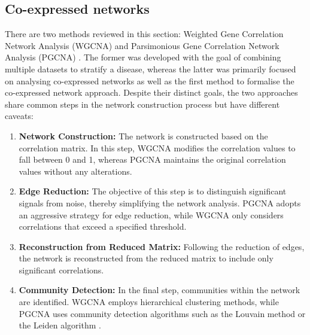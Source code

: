 \subsection{Co-expressed networks} \label{s:lit:co_net}

\vspace{3mm}
\vspace{3mm}

There are two methods reviewed in this section: Weighted Gene Correlation Network Analysis (WGCNA) \citet{Langfelder2008-sn} and Parsimonious Gene Correlation Network Analysis (PGCNA) \citet{Care2019-ij}. The former was developed with the goal of combining multiple datasets to stratify a disease, whereas the latter was primarily focused on analysing co-expressed networks as well as the first method to formalise the co-expressed network approach. Despite their distinct goals, the two approaches share common steps in the network construction process but have different caveats:

\begin{enumerate}
    \item \textbf{Network Construction:} The network is constructed based on the correlation matrix. In this step, WGCNA modifies the correlation values to fall between 0 and 1, whereas PGCNA maintains the original correlation values without any alterations.
    
    \item \textbf{Edge Reduction:} The objective of this step is to distinguish significant signals from noise, thereby simplifying the network analysis. PGCNA adopts an aggressive strategy for edge reduction, while WGCNA only considers correlations that exceed a specified threshold.
    
    \item \textbf{Reconstruction from Reduced Matrix:} Following the reduction of edges, the network is reconstructed from the reduced matrix to include only significant correlations.
    
    \item \textbf{Community Detection:} In the final step, communities within the network are identified. WGCNA employs hierarchical clustering methods, while PGCNA uses community detection algorithms such as the Louvain method \citep{Blondel2008-ik} or the Leiden algorithm \citep{Traag2019-ne}.
\end{enumerate}

